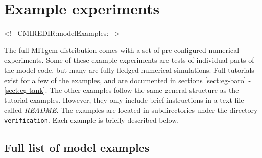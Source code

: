 
\section[MITgcm Example Experiments]{Example experiments}
\label{sect:modelExamples}
\begin{rawhtml}
<!-- CMIREDIR:modelExamples: -->
\end{rawhtml}


The full MITgcm distribution comes with a set of pre-configured numerical experiments. 
Some of these example experiments are tests of individual parts of the model code, but many
are fully fledged numerical simulations. Full tutorials exist for a few of the examples,
and are documented in sections \ref{sect:eg-baro} - \ref{sect:eg-tank}. The other examples 
follow the same general structure as the tutorial examples. However, they only include brief
instructions in a text file called {\it README}.  The examples are located in subdirectories 
under the directory \texttt{verification}.  Each example is briefly described below.

\subsection{Full list of model examples}

